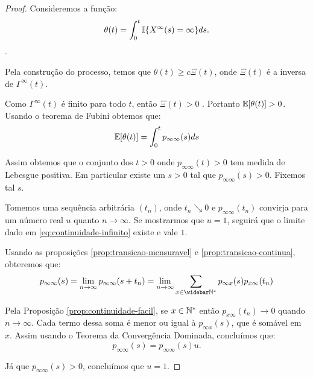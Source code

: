 \begin{proof}
  Consideremos a função:
  \begin{displaymath}
    \theta(t) = \int_0^t {\mathbb{I}} \{ X^\infty (s) = \infty \} ds.
  \end{displaymath}.
  
  Pela construção do processo, temos que $\theta(t) \geq c
  \Xi(t)$, onde $\Xi(t)$ é a inversa de $\Gamma^\infty(t)$.

  Como $\Gamma^\infty(t)$ é \qc finito para todo $t$, então $\Xi(t) >
  0$ \qc. Portanto ${\mathbb{E}} [\theta(t)] > 0$. Usando o teorema de Fubini
  obtemos que:
  \begin{displaymath}
    {\mathbb{E}}[\theta(t)] =  \int_0^t p_{\infty \infty} (s) ds
  \end{displaymath}

  Assim obtemos que o conjunto dos $t > 0$ onde $p_{\infty \infty}(t)
  > 0$ tem medida de Lebesgue positiva. Em particular existe um $s >
  0$ tal que $p_{\infty \infty}(s) > 0$. Fixemos tal $s$.

  Tomemos uma sequência arbitrária $(t_n)$, onde $t_n \searrow 0$ e
  $p_{\infty \infty} (t_n)$ convirja para um número real $u$ quanto $n
  \to \infty$.  Se mostrarmos que $u = 1$, seguirá que o limite dado
  em \eqref{eq:continuidade-infinito} existe e vale $1$.


  Usando as proposições \ref{prop:transicao-mensuravel} e
  \ref{prop:transicao-continua}, obteremos que:
  \begin{displaymath}
    p_{\infty\infty}(s) = \lim_{n \to \infty} p_{\infty \infty}(s+t_n) = \lim_{n \to
      \infty} \sum_{x \in \Nzb} p_{\infty x}(s) p_{x \infty} (t_n)
  \end{displaymath}

  Pela Proposição \ref{prop:continuidade-facil}, se $x \in {\mathbb{N^*}}$ então
  $p_{x \infty}(t_n) \to 0$ quando $n \to \infty$. Cada termo
  dessa soma é menor ou igual à $p_{\infty x} (s)$, que é somável em
  $x$. Assim usando o Teorema da Convergência Dominada, concluímos
  que:
  \begin{displaymath}
    p_{\infty\infty}(s) = p_{\infty \infty}(s)u.
  \end{displaymath}

  Já que $p_{\infty \infty}(s) > 0$, concluímos que $u = 1$.
\end{proof}


